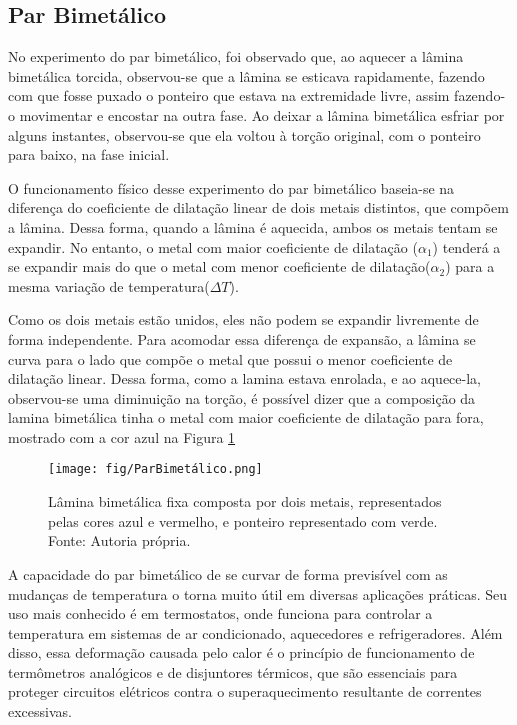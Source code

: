 \subsection{Par Bimetálico}
No experimento do par bimetálico, foi observado que, ao aquecer a lâmina bimetálica torcida, observou-se que a lâmina se esticava rapidamente, fazendo com que fosse puxado o ponteiro que estava na extremidade livre, assim fazendo-o movimentar e encostar na outra fase. Ao deixar a lâmina bimetálica esfriar por alguns instantes, observou-se que ela voltou à torção original, com o ponteiro para baixo, na fase inicial.

O funcionamento físico desse experimento do par bimetálico baseia-se na diferença do coeficiente de dilatação linear de dois metais distintos, que compõem a lâmina. Dessa forma, quando a lâmina é aquecida, ambos os metais tentam se expandir. No entanto, o metal com maior coeficiente de dilatação (\(\alpha_1\)) tenderá  a se expandir mais do que o metal com menor coeficiente de dilatação(\(\alpha_2\)) para a mesma variação de temperatura(\(\Delta T\)).

Como os dois metais estão unidos, eles não podem se expandir livremente de forma independente. Para acomodar essa diferença de expansão, a lâmina se curva para o lado que compõe o metal que possui o menor coeficiente de dilatação linear. Dessa forma, como a lamina estava enrolada, e ao aquece-la, observou-se uma diminuição na torção, é possível dizer que a composição da lamina bimetálica tinha o metal com maior coeficiente de dilatação para fora, mostrado com a cor azul na Figura \cref{ParBimetalico}

\begin{figure}[H]
	\centering
	\texttt{[image: fig/ParBimetálico.png]}
	\caption{Lâmina bimetálica fixa composta por dois metais, representados pelas cores azul e vermelho, e ponteiro representado com verde. Fonte: Autoria própria.}
	\label{ParBimetalico}
\end{figure}

A capacidade do par bimetálico de se curvar de forma previsível com as mudanças de temperatura o torna muito útil em diversas aplicações práticas. Seu uso mais conhecido é em termostatos, onde funciona para controlar a temperatura em sistemas de ar condicionado, aquecedores e refrigeradores. Além disso, essa deformação causada pelo calor é o princípio de funcionamento de termômetros analógicos e de disjuntores térmicos, que são essenciais para proteger circuitos elétricos contra o superaquecimento resultante de correntes excessivas.